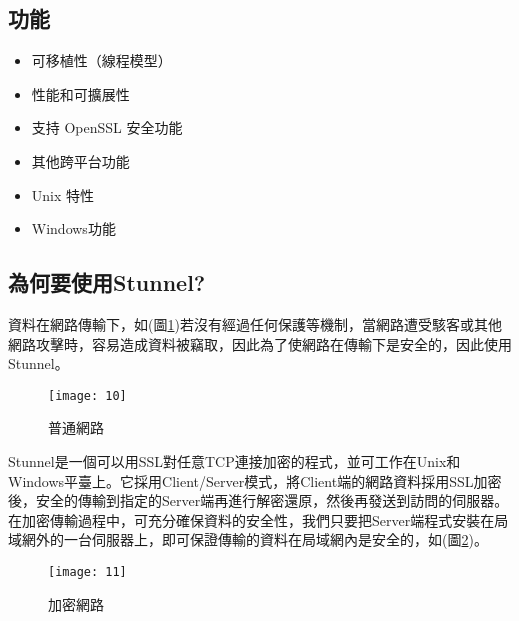 \subsection{功能}
\renewcommand{\baselinestretch}{1} %
\begin{itemize}
	\item 可移植性（線程模型）
	\item 性能和可擴展性
	\item 支持 OpenSSL 安全功能
	\item 其他跨平台功能
	\item Unix 特性
	\item Windows功能	
\end{itemize}
\par

\renewcommand{\baselinestretch}{20} %
\subsection{為何要使用Stunnel?}
\par
\renewcommand{\baselinestretch}{1} %
\twelve \qquad 資料在網路傳輸下，如(圖\ref{fig.普通網路})若沒有經過任何保護等機制，當網路遭受駭客或其他網路攻擊時，容易造成資料被竊取，因此為了使網路在傳輸下是安全的，因此使用Stunnel。
\\
\par
\renewcommand{\baselinestretch}{1.7} %
\begin{figure}[hbt!]
\begin{center}
\texttt{[image: 10]}
\caption{\large 普通網路}\label{fig.普通網路}
\end{center}
\end{figure}
\par
\renewcommand{\baselinestretch}{1} %
\twelve \hspace{0.5em} Stunnel是一個可以用SSL對任意TCP連接加密的程式，並可工作在Unix和Windows平臺上。它採用Client/Server模式，將Client端的網路資料採用SSL加密後，安全的傳輸到指定的Server端再進行解密還原，然後再發送到訪問的伺服器。在加密傳輸過程中，可充分確保資料的安全性，我們只要把Server端程式安裝在局域網外的一台伺服器上，即可保證傳輸的資料在局域網內是安全的，如(圖\ref{fig.加密網路})。
\\
\par
\renewcommand{\baselinestretch}{1.7} %
\begin{figure}[hbt!]
\begin{center}
\texttt{[image: 11]}
\caption{\large 加密網路}\label{fig.加密網路}
\end{center}
\end{figure}
\par
\renewcommand{\baselinestretch}{20} %
